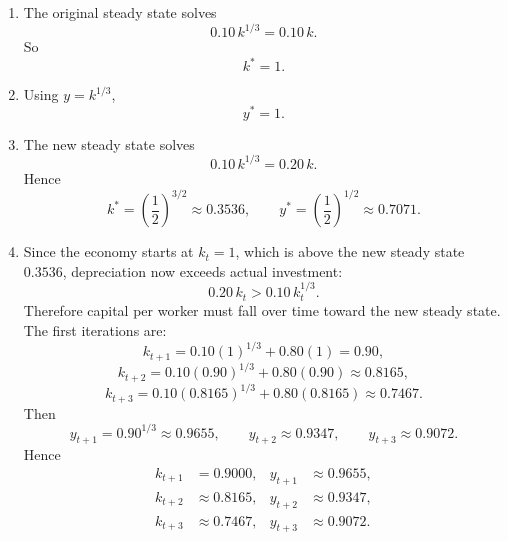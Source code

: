 \documentclass[12pt]{article}
\begin{document}
\begin{enumerate}[label=(\alph*)]
    \item
    The original steady state solves
    \[
    0.10\,k^{1/3}=0.10\,k.
    \]
    So
    \[
    \boxed{k^*=1.}
    \]

    \item
    Using \(y=k^{1/3}\),
    \[
    \boxed{y^*=1.}
    \]

    \item
    The new steady state solves
    \[
    0.10\,k^{1/3}=0.20\,k.
    \]
    Hence
    \[
    \boxed{k^*=\left(\frac{1}{2}\right)^{3/2}\approx 0.3536,}
    \qquad
    \boxed{y^*=\left(\frac{1}{2}\right)^{1/2}\approx 0.7071.}
    \]

    \item
    Since the economy starts at \(k_t=1\), which is above the new steady state \(0.3536\), depreciation now exceeds actual investment:
    \[
    0.20\,k_t > 0.10\,k_t^{1/3}.
    \]
    Therefore capital per worker must fall over time toward the new steady state. The first iterations are:
    \[
    k_{t+1}=0.10(1)^{1/3}+0.80(1)=0.90,
    \]
    \[
    k_{t+2}=0.10(0.90)^{1/3}+0.80(0.90)\approx 0.8165,
    \]
    \[
    k_{t+3}=0.10(0.8165)^{1/3}+0.80(0.8165)\approx 0.7467.
    \]
    Then
    \[
    y_{t+1}=0.90^{1/3}\approx 0.9655,
    \qquad
    y_{t+2}\approx 0.9347,
    \qquad
    y_{t+3}\approx 0.9072.
    \]
    Hence
    \[
    \boxed{
    \begin{aligned}
    k_{t+1}&=0.9000, & y_{t+1}&\approx 0.9655,\\
    k_{t+2}&\approx 0.8165, & y_{t+2}&\approx 0.9347,\\
    k_{t+3}&\approx 0.7467, & y_{t+3}&\approx 0.9072.
    \end{aligned}}
    \]
\end{enumerate}

\begin{center}
\end{center}
\end{document}
